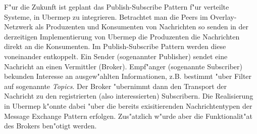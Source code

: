 F"ur die Zukunft ist geplant das Publish-Subscribe Pattern f"ur verteilte Systeme, in Ubermep zu integrieren. 
Betrachtet man die Peers im Overlay-Netzwerk als Produzenten und Konsumenten von Nachrichten so senden in der derzeitigen Implementierung von Ubermep die Produzenten die Nachrichten direkt an die Konsumenten. Im Publish-Subscribe Pattern werden diese voneinander entkoppelt. Ein Sender (sogenannter Publisher) sendet eine Nachricht an einen Vermittler (Broker). Empf"anger (sogenannte Subscriber) bekunden Interesse an ausgew"ahlten Informationen, z.B. bestimmt "uber Filter auf sogenannte \emph{Topics}. Der Broker "ubernimmt dann den Transport der Nachricht zu den registrierten (also interessierten) Subscribern. Die Realisierung in Ubermep k"onnte dabei "uber die bereits exisitierenden Nachrichtentypen der Message Exchange Pattern erfolgen. Zus"atzlich w"urde aber die Funktionalit"at des Brokers ben"otigt werden.